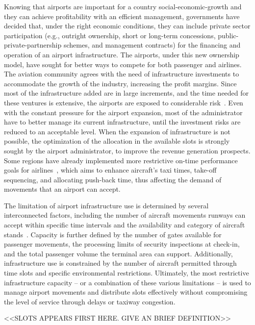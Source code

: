 Knowing that airports are important for a country social-economic-growth and
they can achieve profitability with an efficient management, governments have
decided that, under the right economic conditions, they can include private
sector participation (e.g., outright ownership, short or long-term concessions,
public-private-partnership schemes, and management contracts) for the financing
and operation of an airport infrastructure.
%
The airports, under this new ownership model, have sought for better ways to
compete for both passenger and airlines.
%
The aviation community agrees with the need of infrastructure investments to
accommodate the growth of the industry, increasing the profit margins.
%
Since most of the infrastructure added are in large increments, and the time
needed for these ventures is extensive, the airports are exposed to considerable
risk~\cite{ICAO2013}.
%
Even with the constant pressure for the airport expansion, most of the
administrator have to better manage its current infrastructure, until the
investment risks are reduced to an acceptable level.
%
When the expansion of infrastructure is not possible, the optimization of the
allocation in the available slots is strongly sought by the airport
administrator, to improve the revenue generation prospects.
%
Some regions have already implemented more restrictive on-time performance goals
for airlines~\cite{ravizza2014aircraft}, which aims to enhance aircraft's taxi
times, take-off sequencing, and allocating push-back time, thus affecting the
demand of movements that an airport can accept.



The limitation of airport infrastructure use is determined by several
interconnected factors, including the number of aircraft movements runways can
accept within specific time intervals and the availability and category of
aircraft stands~\cite{ARC2021, WASG2020}.
%
Capacity is further defined by the number of gates available for passenger
movements, the processing limits of security inspections at check-in, and the
total passenger volume the terminal area can support.
%
Additionally, infrastructure use is constrained by the number of aircraft
permitted through time slots and specific environmental restrictions.
%
Ultimately, the most restrictive infrastructure capacity -- or a combination of
these various limitations -- is used to manage airport movements and distribute
slots effectively without compromising the level of service through delays or
taxiway congestion.


<<SLOTS APPEARS FIRST HERE. GIVE AN BRIEF DEFINITION>>






